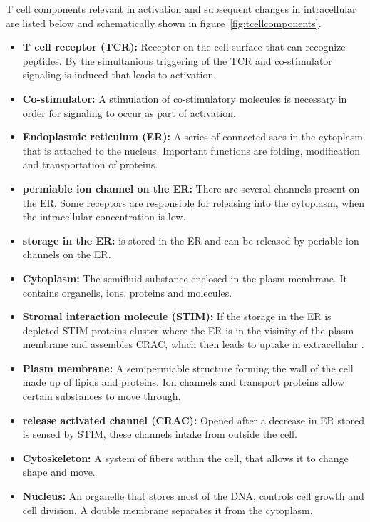 T cell components relevant in activation and subsequent changes in intracellular \Calcium are listed below and schematically shown in figure~\ref{fig:tcellcomponents}.

\begin{itemize}
	\item \textbf{T cell receptor (TCR):} Receptor on the cell surface that can recognize peptides. By the simultanious triggering of the TCR and co-stimulator signaling is induced that leads to activation.
	\item \textbf{Co-stimulator:} A stimulation of co-stimulatory molecules is necessary in order for signaling to occur as part of activation.
	\item \textbf{Endoplasmic reticulum (ER):} A series of connected sacs in the cytoplasm that is attached to the nucleus. Important functions are folding, modification and transportation of proteins.\cite{Rogers2024}
	\item \textbf{\Calcium permiable ion channel on the ER:} There are several \Calcium channels present on the ER. Some receptors are responsible for releasing \Calcium into the cytoplasm, when the intracellular \Calcium concentration is low. \cite{Schwarz2016}
	\item \textbf{\Calcium storage in the ER:} \Calcium is stored in the ER and can be released by \Calcium periable ion channels on the ER.
	\item \textbf{Cytoplasm:} The semifluid substance enclosed in the plasm membrane. It contains organells, ions, proteins and molecules.
	\item \textbf{Stromal interaction molecule (STIM):} If the \Calcium storage in the ER is depleted STIM proteins cluster where the ER is in the visinity of the plasm membrane and assembles CRAC, which then leads to uptake in extracellular \Calcium. \cite{Schwarz2016}
	\item \textbf{Plasm membrane:} A semipermiable structure forming the wall of the cell made up of lipids and proteins. Ion channels and transport proteins allow certain substances to move through.\cite{Ganong2012}
	\item \textbf{\Calcium release activated \Calcium channel (CRAC):} Opened after a decrease in ER stored \Calcium is sensed by STIM, these channels intake \Calcium from outside the cell.\cite{Stathopulos2013}
	\item \textbf{Cytoskeleton:} A system of fibers within the cell, that allows it to change shape and move.\cite{Ganong2012}
	\item \textbf{Nucleus:} An organelle that stores most of the DNA, controls cell growth and cell division. A double membrane separates it from the cytoplasm.\cite{cooper2022}
\end{itemize}

